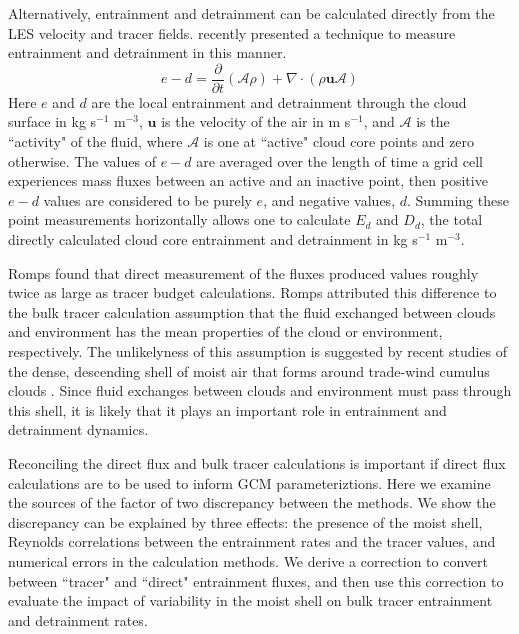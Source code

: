 \documentclass[draft,grl]{agutex}
\begin{document}
\begin{article}
Alternatively, entrainment and detrainment can be calculated directly from the 
LES velocity and tracer fields.  \cite{Romps2010} recently presented a 
technique to measure entrainment and detrainment in this manner.
\begin{equation}
  \label{eq:romps_e_minus_d}
  e - d = \frac{\partial}{\partial t}(\mathcal{A}\rho) 
        + \nabla \cdot (\rho \mathbf{u} \mathcal{A}) 
\end{equation}
Here $e$ and $d$ are the local entrainment and detrainment through the cloud 
surface in kg s$^{-1}$ m$^{-3}$, $\mathbf{u}$ is the velocity of the air in 
m s$^{-1}$, and $\mathcal{A}$ is the ``activity" of the fluid, where 
$\mathcal{A}$ is one at ``active" cloud core points and zero otherwise.  The 
values of $e - d$ are averaged over the length of time a grid cell experiences 
mass fluxes between an active and an inactive point, then positive $e-d$ values 
are considered to be purely $e$, and negative values, $d$.  Summing these point 
measurements horizontally allows one to calculate  $E_d$ and $D_d$, the total 
directly calculated cloud core entrainment and detrainment in kg s$^{-1}$ 
m$^{-3}$.

Romps found that direct measurement of the fluxes produced values roughly twice 
as large as tracer budget calculations.  Romps attributed this difference to 
the bulk tracer calculation assumption that the fluid exchanged between clouds 
and environment has the mean properties of the cloud or environment, 
respectively.  The unlikelyness of this assumption is suggested by recent 
studies of the dense, descending shell of moist air that forms around 
trade-wind cumulus clouds \citep{Heus2008, Wang2010}.  Since fluid exchanges 
between clouds and environment must pass through this shell, it is likely that 
it plays an important role in entrainment and detrainment dynamics.

Reconciling the direct flux and bulk tracer calculations is important if direct 
flux calculations are to be used to inform GCM parameteriztions.  Here we 
examine the sources of the factor of two discrepancy between the methods.  We 
show the discrepancy can be explained by three effects: the presence of the 
moist shell, Reynolds correlations between the entrainment rates and the tracer 
values, and numerical errors in the calculation methods.  We derive a 
correction to convert between ``tracer" and ``direct" entrainment fluxes, and 
then use this correction to evaluate the impact of variability in the moist 
shell on bulk tracer entrainment and detrainment rates.


\end{article}
\end{document}
